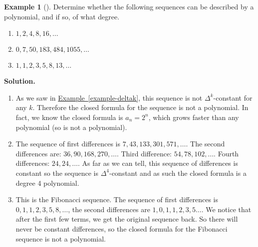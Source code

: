 \documentclass[12pt,]{book}
\theoremstyle{plain}
\theoremstyle{definition}
\theoremstyle{definition}
\newtheorem{example}[theorem]{Example}
\theoremstyle{definition}
\numberwithin{equation}{chapter}
\begin{document}
\begin{example}[]\label{example-17}
\hypertarget{p-247}{}%
Determine whether the following sequences can be described by a polynomial, and if so, of what degree. \leavevmode%
\begin{enumerate}
\item\hypertarget{li-155}{}\(1, 2, 4, 8, 16, \ldots\)%
\item\hypertarget{li-156}{}\(0, 7, 50, 183, 484, 1055, \ldots\)%
\item\hypertarget{li-157}{}\(1,1,2,3,5,8,13,\ldots\)%
\end{enumerate}
%
\par\smallskip%
\noindent\textbf{Solution.}\hypertarget{solution-28}{}\quad%
\hypertarget{p-248}{}%
\leavevmode%
\begin{enumerate}
\item\hypertarget{li-158}{}\hypertarget{p-249}{}%
As we saw in \hyperref[example-deltak]{Example~\ref{example-deltak}}, this sequence is not \(\Delta^k\)-constant for any \(k\). Therefore the closed formula for the sequence is not a polynomial. In fact, we know the closed formula is \(a_n = 2^n\), which grows faster than any polynomial (so is not a polynomial).%
\item\hypertarget{li-159}{}\hypertarget{p-250}{}%
The sequence of first differences is \(7, 43, 133, 301, 571,\ldots\). The second differences are: \(36, 90, 168, 270,\ldots\). Third difference: \(54, 78, 102,\ldots\). Fourth differences: \(24, 24, \ldots\). As far as we can tell, this sequence of differences is constant so the sequence is \(\Delta^4\)-constant and as such the closed formula is a degree 4 polynomial.%
\item\hypertarget{li-160}{}\hypertarget{p-251}{}%
This is the Fibonacci sequence. The sequence of first differences is \(0, 1, 1, 2, 3, 5, 8, \ldots\), the second differences are \(1, 0, 1, 1, 2, 3, 5\ldots\). We notice that after the first few terms, we get the original sequence back. So there will never be constant differences, so the closed formula for the Fibonacci sequence is not a polynomial.%
\end{enumerate}
%
\end{example}
\typeout{************************************************}
\typeout{************************************************}
\end{document}
